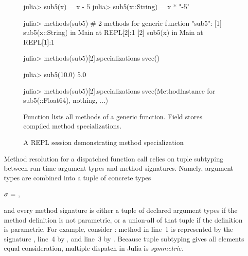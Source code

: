 \begin{figure}[t]
\centering
\begin{minipage}{10cm}
\begin{julia}
julia> sub5(x) = x - 5
julia> sub5(x::String) = x * "-5"

julia> methods(sub5)
# 2 methods for generic function "sub5":
[1] sub5(x::String) in Main at REPL[2]:1
[2] sub5(x) in Main at REPL[1]:1

julia> methods(sub5)[2].specializations
svec()

julia> sub5(10.0)
5.0

julia> methods(sub5)[2].specializations
svec(MethodInstance for sub5(::Float64), nothing, ...)
\end{julia}
\end{minipage}
\caption{A REPL session demonstrating method specialization
}\label{fig:code:specializations}
\begin{tablenotes}[para]
\small
Function  lists all methods of a generic function.
Field  stores compiled method specializations.
\end{tablenotes}
\end{figure}

Method resolution for a dispatched function call 
relies on tuple subtyping~\cite{bib:leavens:tuple-dispatch:1998}
between run-time argument types and method signatures.
Namely, argument types are combined into a tuple of concrete types
\begin{center}
  $\sigma =$ ,
\end{center}
and every method signature is either a tuple of declared argument types
if the method definition is not parametric, or a union-all of that tuple
if the definition is parametric.
For example, consider : method in line~1
is represented by the signature , line~4 by
, and line~3 by
.
Because tuple subtyping gives all elements equal consideration,
multiple dispatch in Julia is \emph{symmetric}.

